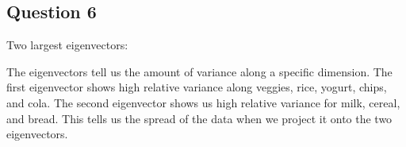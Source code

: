\documentclass{math}
\begin{document}
\subsection*{Question 6}
Two largest eigenvectors:
\begin{center}
\end{center}
The eigenvectors tell us the amount of variance along a specific dimension.
The first eigenvector shows high relative variance along veggies, rice, yogurt,
chips, and cola. The second eigenvector shows us high relative variance for
milk, cereal, and bread. This tells us the spread of the data when we project it
onto the two eigenvectors.
\end{document}
